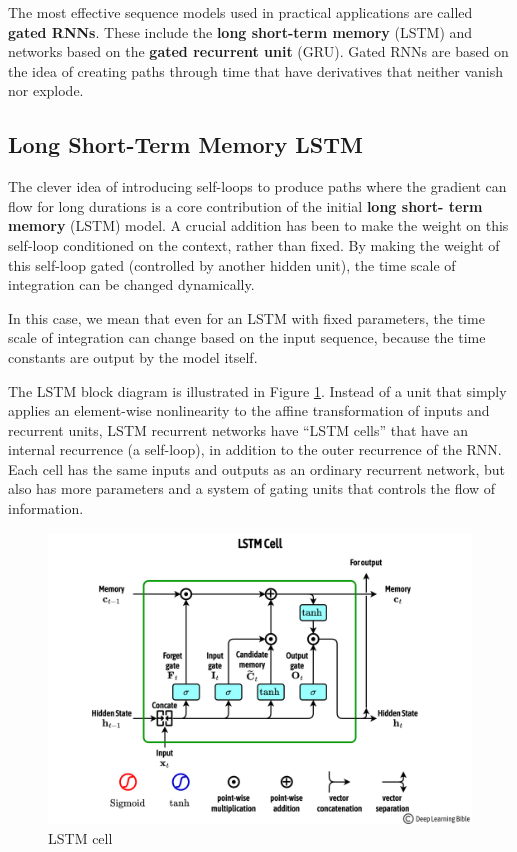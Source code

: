 The most effective sequence models used in practical applications are called
\textbf{gated RNNs}. These include the \textbf{long short-term memory} (LSTM) and
networks based on the \textbf{gated recurrent unit} (GRU). Gated RNNs are based
on the idea of creating paths through time that have derivatives that neither
vanish nor explode.

\subsection{Long Short-Term Memory LSTM}
The clever idea of introducing self-loops to produce paths where the gradient can
flow for long durations is a core contribution of the initial \textbf{long short-
    term memory} (LSTM) model. A crucial addition has been to make the weight on
this self-loop conditioned on the context, rather than fixed. By making the weight
of this self-loop gated (controlled by another hidden unit), the time scale of
integration can be changed dynamically.

In this case, we mean that even for an LSTM with fixed parameters, the time scale
of integration can change based on the input sequence, because the time constants
are output by the model itself.

The LSTM block diagram is illustrated in Figure \ref{fig:lstm}. Instead of a unit
that simply applies an element-wise nonlinearity to the affine transformation of
inputs and recurrent units, LSTM recurrent networks have “LSTM cells” that have
an internal recurrence (a self-loop), in addition to the outer recurrence of the
RNN. Each cell has the same inputs and outputs as an ordinary recurrent network,
but also has more parameters and a system of gating units that controls the flow
of information.

\begin{figure}[!ht]
    \centering
    \includegraphics[width=0.5\linewidth]{img/RNN/LSTM_2.png}
    \caption{LSTM cell}
    \label{fig:lstm}
\end{figure}

